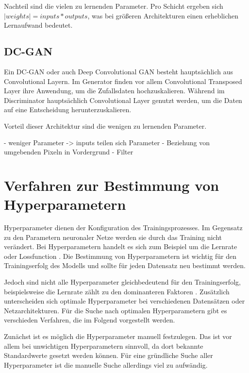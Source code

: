 Nachteil sind die vielen zu lernenden Parameter.
Pro Schicht ergeben sich $|weights| = inputs * outputs$, was bei größeren Architekturen einen erheblichen Lernaufwand bedeutet.

\subsection{DC-GAN}
Ein DC-GAN oder auch Deep Convolutional GAN besteht hauptsächlich aus Convolutional Layern.
Im Generator finden vor allem Convolutional Transposed Layer ihre Anwendung, um die Zufallsdaten hochzuskalieren.
Während im Discriminator hauptsächlich Convolutional Layer genutzt werden, um die Daten auf eine Entscheidung herunterzuskalieren.
\newline

Vorteil dieser Architektur sind die wenigen zu lernenden Parameter.

- weniger Parameter -> inputs teilen sich Parameter
- Beziehung von umgebenden Pixeln in Vordergrund
- Filter

\section{Verfahren zur Bestimmung von Hyperparametern}
\label{chapter:verfahren-bestimmung-hyperparameter}

Hyperparameter dienen der Konfiguration des Trainingsprozesses.
Im Gegensatz zu den Parametern neuronaler Netze werden sie durch das Training nicht verändert.
Bei Hyperparametern handelt es sich zum Beispiel um die Lernrate oder Lossfunction \cite{hyperparameters-gan-using-genetic-algorithm}.
Die Bestimmung von Hyperparametern ist wichtig für den Trainingserfolg des Modells und sollte für jeden Datensatz neu bestimmt werden.


Jedoch sind nicht alle Hyperparameter gleichbedeutend für den Trainingserfolg, beispielsweise die Lernrate zählt zu den dominanteren Faktoren \cite{learning-rate-most-important}.
Zusätzlich unterscheiden sich optimale Hyperparameter bei verschiedenen Datensätzen oder Netzarchitekturen.
Für die Suche nach optimalen Hyperparametern gibt es verschieden Verfahren, die im Folgend vorgestellt werden.

Zunächst ist es möglich die Hyperparameter manuell festzulegen.
Das ist vor allem bei unwichtigen Hyperparametern sinnvoll, da dort bekannte Standardwerte gesetzt werden können.
Für eine gründliche Suche aller Hyperparameter ist die manuelle Suche allerdings viel zu aufwändig.

